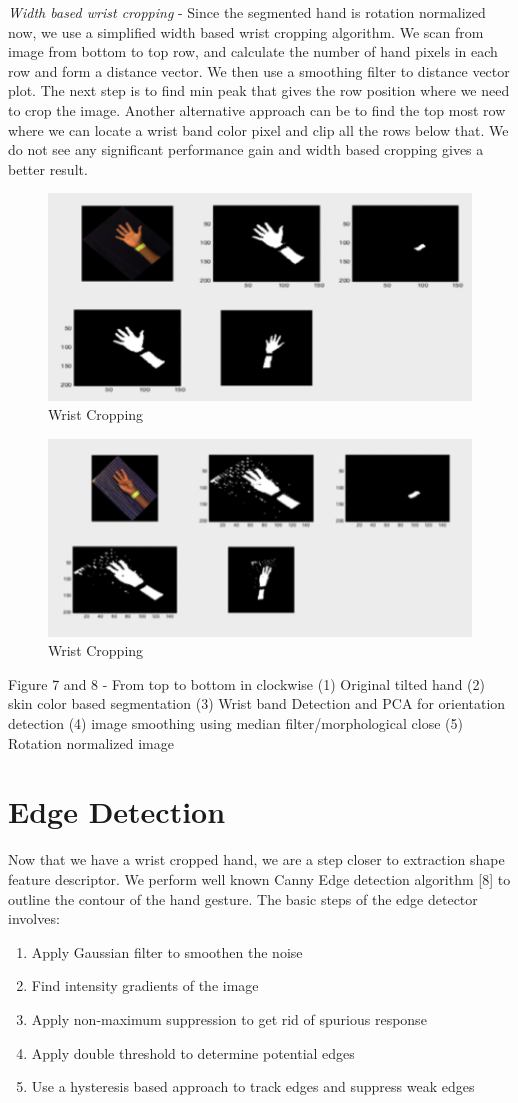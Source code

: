 \documentclass{acm} %
\begin{document}
\textit{Width based wrist cropping} - Since the segmented hand is rotation normalized now, we use a simplified width based wrist cropping algorithm. We scan from image from bottom to top row, and calculate the number of hand pixels in each row and form a distance vector. We then use a smoothing filter to distance vector plot. The next step is to find min peak that gives the row position where we need to crop the image.
Another alternative approach can be to find the top most row where we can locate a wrist band color pixel and clip all the rows below that. We do not see any significant performance gain and width based cropping gives a better result.
\begin{figure}[h]
\centering
\includegraphics[width=3 in]{wrist_cropping1}
\caption{Wrist Cropping}
\label{fig:fig7}
\end{figure}

\begin{figure}[h]
\centering
\includegraphics[width=3 in]{wrist_cropping2}
\caption{Wrist Cropping}
\label{fig:fig8}
\end{figure}
Figure 7 and 8 - From top to bottom in clockwise (1) Original tilted hand (2) skin color based segmentation  (3) Wrist band Detection and PCA for orientation detection (4) image smoothing using median filter/morphological close (5) Rotation normalized image

\section{Edge Detection}
Now that we have a wrist cropped hand, we are a step closer to extraction shape feature descriptor. We perform well known Canny Edge detection algorithm [8] to outline the contour of the hand gesture. The basic steps of the edge detector involves:
\begin{enumerate}
\item Apply Gaussian filter to smoothen the noise
\item Find intensity gradients of the image
\item Apply non-maximum suppression to get rid of spurious response
\item Apply double threshold to determine potential edges
\item Use a hysteresis based approach to track edges and suppress weak edges
\end{enumerate}
\end{document}

